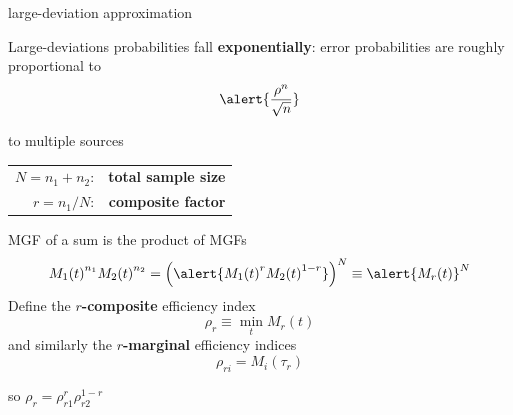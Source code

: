 \documentclass[square,]{gBakerBeamer}
\renewcommand{\|}{\,|\,}
\begin{document}
\begin{frame}{large-deviation approximation}

  Large-deviations probabilities fall \textbf{exponentially}: error probabilities are roughly proportional to
  \begin{equation*}
    \alert{\frac{\rho^n}{\sqrt{n}}
    }  \end{equation*}
  \note{%

  }
\end{frame}


\begin{frame}{to multiple sources}

  \begin{tabular}{rr}
    $N=n_1+n_2$: & \textbf{total sample size}\\
    $r=n_1/N$: & \textbf{composite factor}\bigskip\pause
  \end{tabular}

  MGF of a sum is the product of MGFs
  \begin{align*}
    {M_1(t)}^{n_1}{M_2(t)}^{n_2} = \left(
    \alert{{M_1(t)}^{r}{M_2(t)}^{1-r}}
    \right)^N
    \equiv \alert{M_r(t)}^{N}
  \end{align*}\pause
  Define the \textbf{$r$-composite} efficiency index
  \begin{equation*}
    \rho_r \equiv \min_t {M_r(t)}
  \end{equation*}\pause
  and similarly the \textbf{$r$-marginal} efficiency indices
  \begin{equation*}
    \rho_{ri} = M_i(\tau_r)
  \end{equation*}

  so $\rho_r=\rho_{r1}^r\rho_{r2}^{1-r}$

  \note{%

  }
\end{frame}
\end{document}
